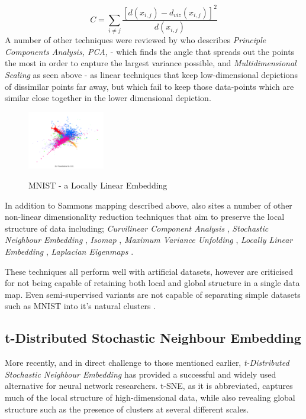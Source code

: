 \documentclass[a4paper,11pt,titlepage]{article}
\begin{document}
		$$
			C = 
			\sum\limits_{i \neq j}
			\frac{ [d(x_{i,j}) - d_{viz}(x_{i,j}) ]^2 }					{d(x_{i,j})}
		$$
		A number of other techniques were reviewed by \cite{VanderMaaten2009} who describes \textit{Principle Components Analysis, PCA,} \cite{Hotelling33} - which finds the angle that spreads out the points the most in order to capture the largest variance possible, and \textit{Multidimensional Scaling} as seen above - as linear techniques that keep low-dimensional depictions of dissimilar points far away, but which fail to keep those data-points which are similar close together in the lower dimensional depiction.
 		
 	\begin{figure}[H]
    			\centering	
			{{\includegraphics[width=0.3\textwidth]
    				{img/hinton_lle.png} 
    			}}%
    			\caption{MNIST - a Locally Linear Embedding}%
    		\label{fig:3nn}
	\end{figure}	 
 		
		\par 
		In addition to Sammons mapping described above, \cite{VanderMaaten2009} also sites a number of other non-linear dimensionality reduction techniques that aim to preserve the local structure of data including; \textit{Curvilinear Component Analysis} \cite{Demartines1995}, \textit{Stochastic Neighbour Embedding} \cite{Hinton2002}, \textit{Isomap} \cite{Tenenbaum2000}, \textit{Maximum Variance Unfolding} \cite{Weinberger2004}, \textit{Locally Linear Embedding} \cite{Roweis2000}, \textit{Laplacian Eigenmaps} \cite{Belkin2002}.

		\par 
		These techniques all perform well with artificial datasets, however are criticised for not being capable of retaining both local and global structure in a single data map. Even semi-supervised variants are not capable of separating simple datasets such as MNIST into it's natural clusters \cite{Song2007}. 
		\par 

	 		
 \subsection{t-Distributed Stochastic Neighbour Embedding}
		More recently, and in direct challenge to those mentioned earlier, \textit{t-Distributed Stochastic Neighbour Embedding} \cite{Maaten2008} has provided a successful and widely used alternative for neural network researchers. t-SNE, as it is abbreviated, captures much of the local structure of high-dimensional data, while also revealing global structure such as the presence of clusters at several different scales.
		\par 
		
\end{document}
